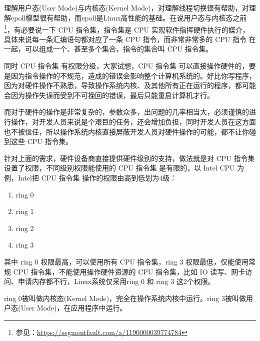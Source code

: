 \documentclass[../../../interview-questions.tex]{subfiles}
\begin{document}
\subsection{\color{red}{用户态(User Mode)与内核态(Kernel Mode)}}

理解用户态(User Mode)与内核态(Kernel Mode)，对理解线程切换很有帮助，对理解epoll模型很有帮助，而epoll是Linux高性能的基础。在说用户态与内核态之前\footnote{参见：\url{https://segmentfault.com/a/1190000039774784}}，有必要说一下 CPU 指令集，指令集是 CPU 实现软件指挥硬件执行的媒介，具体来说每一条汇编语句都对应了一条 CPU 指令，而非常非常多的 CPU 指令 在一起，可以组成一个、甚至多个集合，指令的集合叫 CPU 指令集。

同时 CPU 指令集 有权限分级，大家试想，CPU 指令集 可以直接操作硬件的，要是因为指令操作的不规范，造成的错误会影响整个计算机系统的。好比你写程序，因为对硬件操作不熟悉，导致操作系统内核、及其他所有正在运行的程序，都可能会因为操作失误而受到不可挽回的错误，最后只能重启计算机才行。

而对于硬件的操作是非常复杂的，参数众多，出问题的几率相当大，必须谨慎的进行操作，对开发人员来说是个艰巨的任务，还会增加负担，同时开发人员在这方面也不被信任，所以操作系统内核直接屏蔽开发人员对硬件操作的可能，都不让你碰到这些 CPU 指令集。


针对上面的需求，硬件设备商直接提供硬件级别的支持，做法就是对 CPU 指令集设置了权限，不同级别权限能使用的 CPU 指令集 是有限的，以 Intel CPU 为例，Intel把 CPU 指令集 操作的权限由高到低划为4级：

\begin{enumerate}
\item {ring 0}
\item {ring 1}
\item {ring 2}
\item {ring 3}
\end{enumerate}


其中 ring 0 权限最高，可以使用所有 CPU 指令集，ring 3 权限最低，仅能使用常规 CPU 指令集，不能使用操作硬件资源的 CPU 指令集，比如 IO 读写、网卡访问、申请内存都不行，Linux系统仅采用ring 0 和 ring 3 这2个权限。

ring 0被叫做内核态(Kernel Mode)，完全在操作系统内核中运行。ring 3被叫做用户态(User Mode)，在应用程序中运行。
\end{document}
